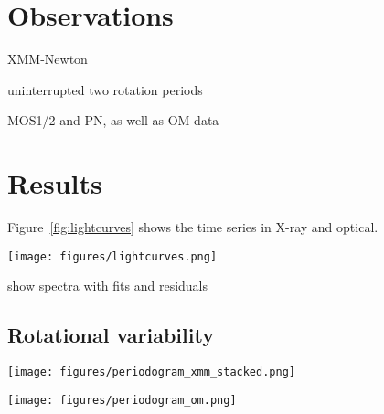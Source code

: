 \documentclass[twocolumn]{aastex631}
\begin{document}
\section{Observations}

XMM-Newton

uninterrupted two rotation periods

MOS1/2 and PN, as well as OM data

\section{Results}

Figure~\ref{fig:lightcurves} shows the time series in X-ray and optical. 

\begin{figure*}[ht!]
    \begin{centering}
        \texttt{[image: figures/lightcurves.png]}
        \caption{
         Top panel: Optical Monitoring (OM) light curve. Bottom panel: X-ray (PN, MOS1 and MOS2 combined) light curve. 
        }
        \label{fig:lightcurves}
    \end{centering}
\end{figure*}


show spectra with fits and residuals

\subsection{Rotational variability}

\begin{figure*}[ht!]
    \begin{centering}
        \texttt{[image: figures/periodogram\_xmm\_stacked.png]}
        \caption{
         MOS and PN light curves stacked Lomb-Scargle periodogram.
        }
        \label{fig:coherence_hist}
    \end{centering}
\end{figure*}

\begin{figure*}[ht!]
    \begin{centering}
        \texttt{[image: figures/periodogram\_om.png]}
        \caption{
         OM light curve Lomb-Scargle periodogram.
        }
        \label{fig:coherence_hist}
    \end{centering}
\end{figure*}
\end{document}
